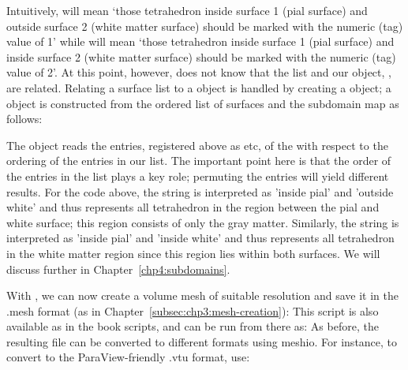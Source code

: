 Intuitively,  will mean `those tetrahedron 
inside surface 1 (pial surface) and outside surface 2 (white matter surface) 
should be marked with the numeric (tag) value of 1' while 
 will mean `those tetrahedron inside surface 1 
(pial surface) and inside surface 2 (white matter surface) should be marked 
with the numeric (tag) value of 2'. At this point, however, \svmtk{} does not 
know that the  list and our 
 object, , are related. Relating 
a surface list to a  object is handled by creating 
a  object; a  object is constructed  
from the ordered list of surfaces and the subdomain map as follows:

\noindent The  object reads the entries,
registered above as  etc, of the
 with respect to the ordering of the
entries in our  list. The important point here
is that the order of the entries in the  list
plays a key role; permuting the entries will yield different results.
For the code above, the string  is interpreted as
'inside pial' and 'outside white' and thus represents all tetrahedron
in the region between the pial and white surface; this region consists
of only the gray matter. Similarly, the string  is
interpreted as 'inside pial' and 'inside white' and thus represents
all tetrahedron in the white matter region since this region lies
within both surfaces. We will discuss 
further in Chapter~\ref{chp4:subdomains}.

With , we can now create a volume mesh of
suitable resolution and save it in the .mesh format (as in
Chapter~\ref{subsec:chp3:mesh-creation}):
This script is also available as  in the
book scripts, and can be run from there as:
\noindent As before, the resulting  file can be converted to different formats
using meshio. For instance, to convert to the ParaView-friendly .vtu format, use:

